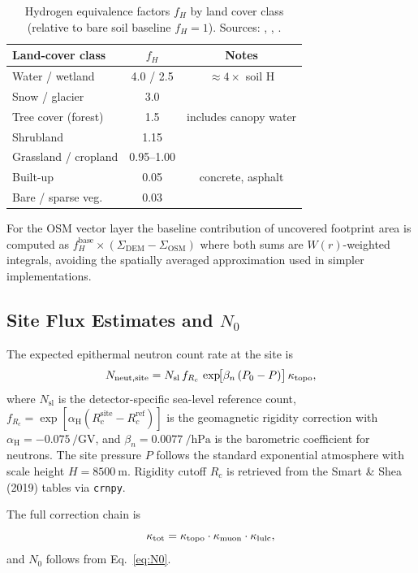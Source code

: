 \begin{table}[h]
\centering
\caption{Hydrogen equivalence factors $f_H$ by land cover class
(relative to bare soil baseline $f_H = 1$).
Sources: \citet{schron2017}, \citet{iwema2017}, \citet{franz2012}.}
\label{tab:fH}
\begin{tabular}{lcc}
\toprule
Land-cover class      & $f_H$ & Notes \\
\midrule
Water / wetland       & 4.0 / 2.5 & $\approx 4\times$ soil H \\
Snow / glacier        & 3.0       & \\
Tree cover (forest)   & 1.5       & includes canopy water \\
Shrubland             & 1.15      & \\
Grassland / cropland  & 0.95–1.00 & \\
Built-up              & 0.05      & concrete, asphalt \\
Bare / sparse veg.    & 0.03      & \\
\bottomrule
\end{tabular}
\end{table}

For the OSM vector layer the baseline contribution of uncovered
footprint area is computed as
$f_H^\mathrm{base}\times(\Sigma_\mathrm{DEM} - \Sigma_\mathrm{OSM})$
where both sums are $W(r)$-weighted integrals, avoiding the
spatially averaged approximation used in simpler implementations.

\subsection{Site Flux Estimates and \texorpdfstring{$N_0$}{N0}}
\label{sec:fluxes}

The expected epithermal neutron count rate at the site is
\begin{equation}
  N_\mathrm{neut,site} =
    N_\mathrm{sl}\,f_{R_c}\,
    \exp\!\bigl[\beta_n\,(P_0 - P)\bigr]\,\kappa_\mathrm{topo},
  \label{eq:Nneut_site}
\end{equation}
where $N_\mathrm{sl}$ is the detector-specific sea-level reference
count, $f_{R_c} = \exp[\alpha_\mathrm{H}(R_c^\mathrm{site}
- R_c^\mathrm{ref})]$ is the geomagnetic rigidity correction
\citep{hawdon2014} with $\alpha_\mathrm{H} = -0.075\,\si{\per\giga\volt}$,
and $\beta_n = \SI{0.0077}{\per\hecto\pascal}$ is the
barometric coefficient for neutrons.
The site pressure $P$ follows the standard exponential atmosphere
with scale height $H = \SI{8500}{\metre}$.
Rigidity cutoff $R_c$ is retrieved from the Smart \& Shea (2019)
tables via \texttt{crnpy}.

The full correction chain is
\begin{equation}
  \kappa_\mathrm{tot} = \kappa_\mathrm{topo} \cdot \kappa_\mathrm{muon} \cdot \kappa_\mathrm{lulc},
  \label{eq:kappa_tot}
\end{equation}
and $N_0$ follows from Eq.~\eqref{eq:N0}.
